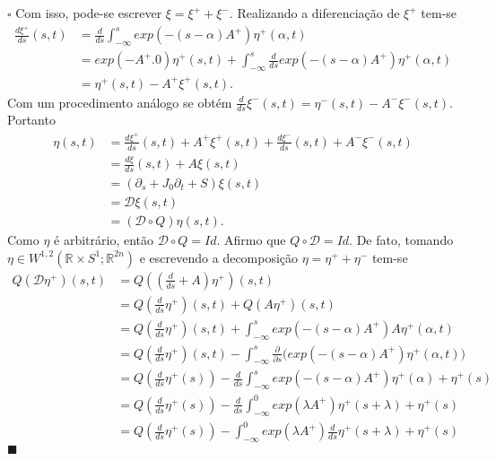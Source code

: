 \documentclass[12pt]{book}
\newenvironment{prova}[1]{$\square$ #1}{\hfill$\blacksquare$}
\newcommand{\circulo}{S^{1}}
\newcommand{\diferencialfloerabrev}{\mathcal{D}}
\newcommand{\derivada}[2]{\frac{d #1}{d #2}}
\newcommand{\derivadaparcial}[2]{\frac{\partial #1}{\partial #2}}
\newcommand{\derivadaparcialabrev}[1]{\partial_{#1}}
\newcommand{\espacosobolevgeral}[2]{W^{1,#1}(#2)}
\newcommand{\estruturacomplexa}{J_{0}}
\newcommand{\retacartesianocirculo}{\real{} \times \circulo}
\newcommand{\real}[1]{\mathbb{R}^{#1}}
\begin{document}
\begin{prova}
		Com isso, pode-se escrever $\xi = \xi^{+} + \xi^{-}$. Realizando a diferenciação de $\xi^{+}$ tem-se
		$$
		\begin{aligned}
		\derivada{\xi^{+}}{s}(s,t) 
		&= \derivada{}{s}\int_{-\infty}^{s}exp(-(s-\alpha)A^{+})\eta^{+}(\alpha,t)
		\\
		&= exp(-A^{+}.0)\eta^{+}(s,t)+\int_{-\infty}^{s} \derivada{}{s} exp(-(s-\alpha)A^{+})\eta^{+}(\alpha,t) 
		\\
		&= \eta^{+}(s,t)-A^{+}\xi^{+}(s,t).
		\end{aligned}
		$$
		Com um procedimento análogo se obtém $\derivada{}{s}\xi^{-} (s,t)= \eta^{-}(s,t)-A^{-}\xi^{-}(s,t)$. Portanto 
		$$
		\begin{aligned}
			\eta(s,t) 
			&= \derivada{\xi^{+}}{s}(s,t)+A^{+}\xi^{+}(s,t)+\derivada{\xi^{-}}{s}(s,t)+A^{-}\xi^{-}(s,t)
			\\ 
			&=\derivada{\xi}{s}(s,t)+A\xi(s,t)
			\\
			&= (\derivadaparcialabrev{s}+\estruturacomplexa \derivadaparcialabrev{t} + S)\xi(s,t)
			\\
			&= \diferencialfloerabrev \xi(s,t) 
			\\
			&= (\diferencialfloerabrev \circ Q)\eta(s,t).
		\end{aligned}
		$$
		Como $\eta$ é arbitrário, então $\diferencialfloerabrev \circ Q=Id$. Afirmo que $Q\circ \diferencialfloerabrev = Id$. De fato, tomando $\eta \in \espacosobolevgeral{2}{\retacartesianocirculo;\real{2n}}$ e escrevendo a decomposição $\eta=\eta^{+}+\eta^{-}$ tem-se
		$$
		\begin{aligned}
		Q(\diferencialfloerabrev \eta^{+})(s,t)
		&=Q((\derivada{}{s}+A)\eta^{+})(s,t)
		\\
		&=Q(\derivada{}{s}\eta^{+})(s,t) +Q(A\eta^{+})(s,t)
		\\
		&=Q(\derivada{}{s}\eta^{+})(s,t)  + \int_{-\infty}^{s}exp(-(s-\alpha)A^{+})A\eta^{+}(\alpha,t)
		\\
		&=Q(\derivada{}{s}\eta^{+})(s,t) - \int_{-\infty}^{s}\derivadaparcial{}{s}\Big(exp(-(s-\alpha)A^{+})\eta^{+}(\alpha,t)\Big)
		\\
		&=Q(\derivada{}{s}\eta^{+}(s)) - \derivada{}{s}\int_{-\infty}^{s} exp(-(s-\alpha)A^{+})\eta^{+}(\alpha) + \eta^{+}(s)
		\\
		&=Q(\derivada{}{s}\eta^{+}(s)) - \derivada{}{s}\int_{-\infty}^{0} exp(\lambda A^{+})\eta^{+}(s+\lambda) + \eta^{+}(s)
		\\
		&=Q(\derivada{}{s}\eta^{+}(s)) - \int_{-\infty}^{0} exp(\lambda A^{+})\derivada{}{s}\eta^{+}(s+\lambda) + \eta^{+}(s)

\end{aligned}$$
\end{prova}
\end{document}
